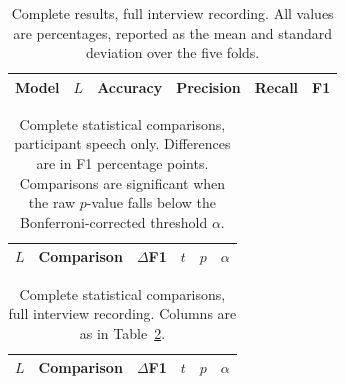 \documentclass{mproj}
\begin{document}
\begin{table}[htbp]
  \centering
  \caption{Complete results, full interview recording. All values are
  percentages, reported as the mean and standard deviation over the five folds.}
  \label{tab:appendix-metrics-full}
  \begin{tabular}{llcccc}
    \toprule
    Model & $L$ & Accuracy & Precision & Recall & F1 \\
    \midrule
    \bottomrule
  \end{tabular}
\end{table}


\begin{table}[htbp]
  \centering
  \caption{Complete statistical comparisons, participant speech only.
  Differences are in F1 percentage points. Comparisons are significant when the
  raw $p$-value falls below the Bonferroni-corrected threshold $\alpha$.}
  \label{tab:appendix-stats-participant}
  \begin{tabular}{llcccc}
    \toprule
    $L$ & Comparison & $\Delta$F1 & $t$ & $p$ & $\alpha$ \\
    \midrule
    \bottomrule
  \end{tabular}
\end{table}


\begin{table}[htbp]
  \centering
  \caption{Complete statistical comparisons, full interview recording. Columns
  are as in Table~\ref{tab:appendix-stats-participant}.}
  \label{tab:appendix-stats-full}
  \begin{tabular}{llcccc}
    \toprule
    $L$ & Comparison & $\Delta$F1 & $t$ & $p$ & $\alpha$ \\
    \midrule
    \bottomrule
  \end{tabular}
\end{table}



\end{document}
